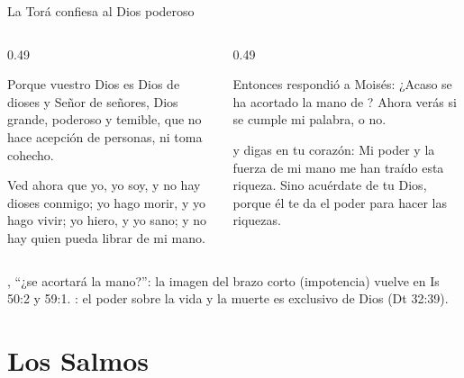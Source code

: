 \begin{frame}{La Torá confiesa al Dios poderoso}
\begin{columns}[t,onlytextwidth]
\begin{column}{0.49\textwidth}
\begin{center}\scriptsize{}\end{center}
\begin{cita}[fontupper=\scriptsize\itshape]Porque \SENOR{} vuestro Dios es Dios de dioses y Señor de señores, Dios grande, poderoso y temible, que no hace acepción de personas, ni toma cohecho.\end{cita}
\begin{cita}[fontupper=\scriptsize\itshape]Ved ahora que yo, yo soy, y no hay dioses conmigo; yo hago morir, y yo hago vivir; yo hiero, y yo sano; y no hay quien pueda librar de mi mano.\end{cita}
\end{column}
\begin{column}{0.49\textwidth}
\begin{cita}[fontupper=\scriptsize\itshape]Entonces \SENOR{} respondió a Moisés: ¿Acaso se ha acortado la mano de \SENOR? Ahora verás si se cumple mi palabra, o no.\end{cita}
\begin{cita}[fontupper=\scriptsize\itshape]y digas en tu corazón: Mi poder y la fuerza de mi mano me han traído esta riqueza. Sino acuérdate de \SENOR{} tu Dios, porque él te da el poder para hacer las riquezas.\end{cita}
\end{column}
\end{columns}
\scriptsize{}, ``¿se acortará la mano?'': la imagen del brazo corto (impotencia) vuelve en Is 50:2 y 59:1. : el poder sobre la vida y la muerte es exclusivo de Dios (Dt 32:39).
\end{frame}

\section{Los Salmos}

